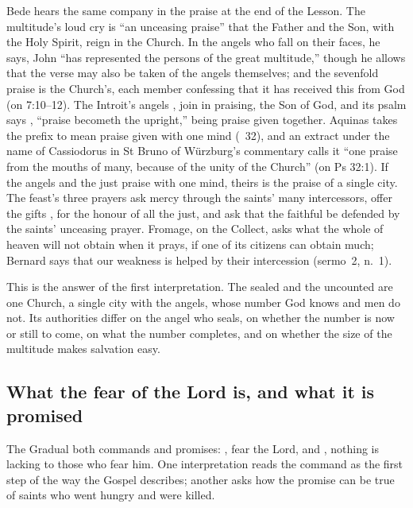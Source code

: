 Bede hears the same company in the praise at the end of the Lesson. The
multitude's loud cry is ``an unceasing praise'' that the Father and the Son,
with the Holy Spirit, reign in the Church. In the angels who fall on their
faces, he says, John ``has represented the persons of the great multitude,''
though he allows that the verse may also be taken of the angels themselves;
and the sevenfold praise is the Church's, each member confessing that it has
received this from God (on 7:10--12). The Introit's angels ,
join in praising, the Son of God, and its psalm says , ``praise becometh the upright,''  being praise
given together. Aquinas takes the prefix to mean praise given with one mind
(\ 32), and an extract under the name of Cassiodorus in St Bruno
of Würzburg's commentary calls it ``one praise from the mouths of many,
because of the unity of the Church'' (on Ps 32:1). If the angels and the just
praise with one mind, theirs is the praise of a single city. The feast's
three prayers ask mercy through the saints' many intercessors, offer the
gifts , for the honour of all the
just, and ask that the faithful be defended by the saints' unceasing prayer.
Fromage, on the Collect, asks what the whole of heaven will not obtain when it
prays, if one of its citizens can obtain much; Bernard says that our weakness
is helped by their intercession (sermo~2, n.~1).

This is the answer of the first interpretation. The sealed and the uncounted
are one Church, a single city with the angels, whose number God knows and men
do not. Its
authorities differ on the angel who seals, on whether the number is now or
still to come, on what the number completes, and on whether the size of the
multitude makes salvation easy.

\subsection{What the fear of the Lord is, and what it is promised}

The Gradual both commands and promises: , fear the Lord,
and , nothing is lacking to those who fear
him. One interpretation reads the command as the first step of the way the
Gospel describes; another asks how the promise can be true of saints who went
hungry and were killed.

